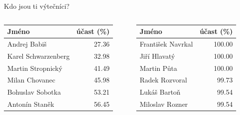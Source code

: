 \documentclass[10pt]{beamer}
\begin{document}
\begin{frame}{Kdo jsou ti výtečníci?}
    \begin{columns}
        \begin{column}{0.5\textwidth}
           \begin{tabular}{lr}
                    \hline
                        Jméno & účast (\%) \\
                    \hline
                        Andrej Babiš &  27.36 \\
                      Karel Schwarzenberg &  32.98 \\
                        Martin Stropnický &  41.49 \\
                           Milan Chovanec &  45.98 \\
                         Bohuslav Sobotka &  53.21 \\
                          Antonín Staněk &  56.45
                \end{tabular}
            \end{column}
            \begin{column}{0.5\textwidth}
                \begin{tabular}{lr}
                    \hline
                       Jméno &        účast (\%) \\
                    \hline
                      František Navrkal &  100.00 \\
                           Jiří Hlavatý &  100.00 \\
                           Martin Půta &  100.00 \\
                         Radek Rozvoral &   99.73 \\
                           Lukáš Bartoň &   99.54 \\
                      Miloslav Rozner &   99.54
                \end{tabular}
        \end{column}
    \end{columns}
\end{frame}
\end{document}
